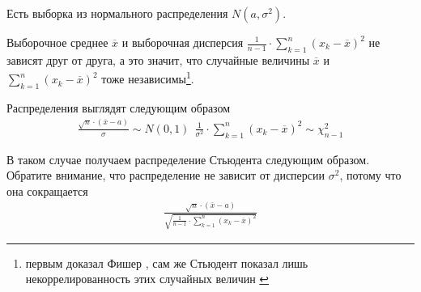 \begin{example}
  Есть выборка \xsample из нормального распределения
  $N\left( a, \sigma^2 \right)$.

  Выборочное среднее $\overline{x}$ и выборочная дисперсия
  $\frac{1}{n-1} \cdot \sum_{k=1}^{n} \left( x_k - \overline{x} \right)^2$
  не зависят друг от друга, а это значит, что случайные величины
  $\overline{x}$ и $\sum_{k=1}^{n} \left( x_k - \overline{x} \right)^2$ тоже
  независимы\footnote{первым доказал Фишер \cite{FisherStudentApplication},
  сам же Стьюдент показал лишь некоррелированность этих случайных величин
  \cite{StudentProbableError}}.

  Распределения выглядят следующим образом
  \begin{align*}
      \frac{\sqrt{n} \cdot \left( \overline{x} - a \right)}{\sigma}
      \sim N\left( 0, 1 \right) \ \
      \frac{1}{\sigma^2}
          \cdot \sum_{k=1}^{n}\left( x_k - \overline{x} \right)^2
          \sim \chi_{n-1}^2
  \end{align*}

  В таком случае получаем распределение Стьюдента следующим образом. Обратите
  внимание, что распределение не зависит от дисперсии $\sigma^2$, потому что
  она сокращается
  \begin{align*}
      \frac{\sqrt{n} \cdot \left( \overline{x} - a \right)}{
      \sqrt{\frac{1}{n-1}
          \cdot \sum_{k=1}^{n}\left( x_k - \overline{x} \right)^2}}
  \end{align*}
\end{example}
